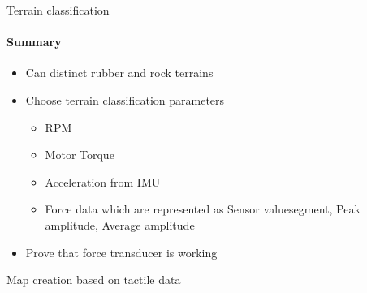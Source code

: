 \documentclass[aspectratio=169]{beamer}
\begin{document}
\begin{frame}[t]{Terrain classification}
    \framesubtitle{Summary}
    \Large
    \begin{itemize}
        \item Can distinct rubber and rock terrains
        \item Choose terrain classification parameters
              \begin{itemize}
                  \item RPM
                  \item Motor Torque
                  \item Acceleration from IMU
                  \item Force data which are represented as Sensor value\/segment, Peak amplitude, Average amplitude
              \end{itemize}
        \item Prove that force transducer is working
    \end{itemize}
\end{frame}

\begin{frame}[t]{Map creation based on tactile data}
    \framesubtitle{}
\end{frame}
\end{document}
